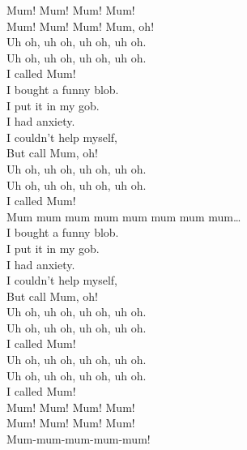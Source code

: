 


Mum! Mum! Mum! Mum! \\
Mum! Mum! Mum! Mum, oh! \\

Uh oh, uh oh, uh oh, uh oh. \\
Uh oh, uh oh, uh oh, uh oh. \\
I called Mum! \\

I bought a funny blob. \\
I put it in my gob. \\
I had anxiety. \\
I couldn't help myself, \\
But call Mum, oh! \\

Uh oh, uh oh, uh oh, uh oh. \\
Uh oh, uh oh, uh oh, uh oh. \\
I called Mum! \\

Mum mum mum mum mum mum mum mum… \\

I bought a funny blob. \\
I put it in my gob. \\
I had anxiety. \\
I couldn't help myself, \\
But call Mum, oh! \\

Uh oh, uh oh, uh oh, uh oh. \\
Uh oh, uh oh, uh oh, uh oh. \\
I called Mum! \\

Uh oh, uh oh, uh oh, uh oh. \\
Uh oh, uh oh, uh oh, uh oh. \\
I called Mum! \\

Mum! Mum! Mum! Mum! \\
Mum! Mum! Mum! Mum! \\
Mum-mum-mum-mum-mum! \\




